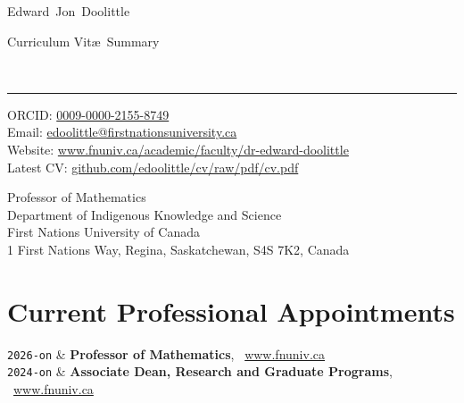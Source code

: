 \documentclass[9pt,letterpaper]{article}
\makeatletter
\newcommand{\FNUniv}{First Nations University of Canada}
\newcommand{\Title}{Curriculum Vit\ae\ Summary}
\newcommand{\FirstName}{Edward}
\newcommand{\MiddleName}{Jon}
\newcommand{\LastName}{Doolittle}
\newcommand{\MyName}{\FirstName\ \MiddleName\ \LastName}
\newcommand{\Email}{edoolittle@firstnationsuniversity.ca}
\newcommand{\PersonalWebsite}{www.fnuniv.ca/academic/faculty/dr-edward-doolittle}
\newcommand{\LabWebsite}{www.fnuniv.ca}
\newcommand{\ORCID}{0009-0000-2155-8749}
\newcommand{\Duration}[2]{\fontsize{10pt}{0}\selectfont \texttt{#1-#2}}
\newcommand{\Ongoing}{on}
\newcommand{\Website}[1]{\href{https://#1}{#1}}
\newcommand{\MYhref}[3][darkblue]{\href{#2}{\color{#1}{#3}}}
\makeatother
\begin{document}
\begin{minipage}[t]{0.5\textwidth}
  {\fontsize{20pt}{0}\selectfont\MyName}
\end{minipage}
\begin{minipage}[t]{0.5\textwidth}
  \begin{flushright}
    \Title{}
  \end{flushright}
\end{minipage}
\\[-0.1cm]
\textcolor{lightgray}{\rule{\textwidth}{3pt}}
\begin{minipage}[t]{0.45\textwidth}
  ORCID: \href{https://orcid.org/\ORCID}{\ORCID}
  \\
  Email: \href{mailto:\Email}{\Email}
  \\
  Website: \Website{\PersonalWebsite}
  \\
  Latest CV: \Website{github.com/edoolittle/cv/raw/pdf/cv.pdf}
\end{minipage}
\begin{minipage}[t]{0.55\textwidth}
  \begin{flushright}
  Professor of Mathematics
  \\
  Department of Indigenous Knowledge and Science
  \\
  First Nations University of Canada
  \\
  1 First Nations Way, Regina, Saskatchewan, S4S 7K2, Canada
  \end{flushright}
\end{minipage}
\vspace{0.3cm}

\section{Current Professional Appointments}

\begin{EntriesTableDuration}
  \Duration{2026}{\Ongoing} & \textbf{Professor of
    Mathematics}, \MYhref{https://www.fnuniv.ca}{\FNUniv}\
  \Website{www.fnuniv.ca} %
  \\ %
  \Duration{2024}{\Ongoing} & \textbf{Associate Dean, Research and
    Graduate Programs}, \MYhref{https://www.fnuniv.ca}{\FNUniv}\
  \Website{www.fnuniv.ca} %
\end{EntriesTableDuration}

\end{document}
